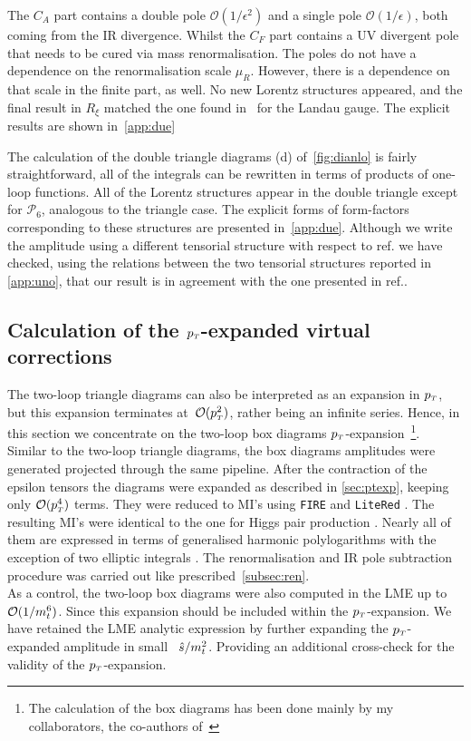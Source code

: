 The $C_A$ part contains a double pole $ \mathcal O( 1/\epsilon^2) $  and a single pole $ \mathcal O( 1/\epsilon) $, both  coming from the IR divergence. Whilst the $C_F$ part contains a UV divergent pole that needs to be cured via mass renormalisation. The poles do not have a dependence on the renormalisation scale $ \mu_R$. However, there is a dependence on that scale in the finite part, as well.  No new Lorentz structures appeared, and the final result in $R_\xi$ matched the one found in~\cite{Spira:1995rr,Aglietti:2006tp} for the Landau gauge. The explicit results are shown in~\autoref{app:due}
%
\par  The calculation of the double triangle diagrams (d) of~\autoref{fig:dianlo} is fairly straightforward, all of the 
 integrals can be rewritten in terms of products of one-loop functions. All of the Lorentz structures appear in the double triangle except for $\mathcal{P}_6$, analogous to the triangle case. The explicit forms of form-factors corresponding to these structures are presented in~\autoref{app:due}. Although we write the amplitude using a different
tensorial structure with respect to ref.\cite{Davies:2020drs} we have checked,
using the relations between the two tensorial structures reported in 
\autoref{app:uno}, that our result is in agreement with the one presented
in ref.\cite{Hasselhuhn:2016rqt}.
\subsection{Calculation of the $p_{\scriptscriptstyle T}$-expanded virtual corrections}
\par The two-loop triangle diagrams can also be interpreted as an expansion in $p_{\scriptscriptstyle T}$, but this expansion terminates at~${\cal O}(p_{\scriptscriptstyle T}^2)$, rather being an infinite series. Hence, in this section we concentrate on the two-loop box diagrams $p_{\scriptscriptstyle T}$-expansion~\footnote{The calculation of the box diagrams has been done mainly by my collaborators, the co-authors of~\cite{Alasfar:2021ppe}}.\\
Similar to the two-loop triangle diagrams, the box diagrams amplitudes were generated projected through the same pipeline. After the contraction of the epsilon tensors the diagrams were expanded as
described in \autoref{sec:ptexp}, keeping only ${\cal O}(p_{\scriptscriptstyle T}^4)$ terms. They were reduced to MI's
using \texttt{FIRE} \cite{Smirnov:2014hma} and \texttt{LiteRed} \cite{Lee:2013mka}. The
resulting MI's were identical to the one for Higgs pair
production \cite{Bonciani:2018omm}. Nearly all of them are expressed
in terms of generalised harmonic polylogarithms with the exception of
two elliptic integrals \cite{vonManteuffel:2017hms, Bonciani:2018uvv}. The renormalisation and IR pole subtraction procedure was carried out like prescribed~\autoref{subsec:ren}.\\
As a control, the two-loop box diagrams were also computed in the LME up to  $\mathcal{O}(1/m_t^6)$. Since this expansion should be included within the $p_{\scriptscriptstyle T}$-expansion. We have retained the LME analytic expression by further expanding the $p_{\scriptscriptstyle T}$-expanded amplitude in small ~$\hat{s}/m_t^2$. Providing an additional cross-check for the validity of the $p_{\scriptscriptstyle T}$-expansion.
